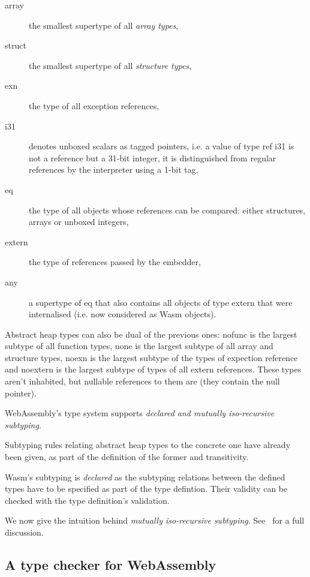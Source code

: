 \documentclass[10pt]{article}
\begin{document}
\begin{description}
\begin{description}
      \item[\textsf{array}] the smallest supertype of all \emph{array types},
      \item[\textsf{struct}] the smallest supertype of all \emph{structure
      types},
      \item[\textsf{exn}] the type of all exception references,
      \item[\textsf{i31}] denotes unboxed scalars as tagged pointers, i.e. a
        value of type \textsf{ref i31} is not a reference but a 31-bit integer,
        it is distinguished from regular references by the interpreter using a
        1-bit tag,
      \item[\textsf{eq}] the type of all objects whose references can be
        compared: either structures, arrays or unboxed integers,
      \item[\textsf{extern}] the type of references passed by the embedder,
      \item[\textsf{any}] a supertype of \textsf{eq} that also contains all
        objects of type \textsf{extern} that were internalised (i.e. now
        considered as Wasm objects).
    \end{description}
    Abstract heap types can also be dual of the previous ones: \textsf{nofunc}
    is the largest subtype of all function types, \textsf{none} is the largest
    subtype of all array and structure types, \textsf{noexn} is the largest
    subtype of the types of expection reference and \textsf{noextern} is the
    largest subtype of types of all extern references. These types aren't
    inhabited, but nullable references to them are (they contain the null
    pointer).

\end{description}

WebAssembly's type system supports \emph{declared and mutually iso-recursive
subtyping}.

Subtyping rules relating abstract heap types to the concrete one have already
been given, as part of the definition of the former and transitivity.

Wasm's subtyping is \emph{declared} as the subtyping relations between the
defined types have to be specified as part of the type defintion. Their validity
can be checked with the type definition's validation.

We now give the intuition behind \emph{mutually iso-recursive subtyping}.
See~\cite{rossberg2023mutually} for a full discussion.
\subsection{A type checker for WebAssembly}
\end{document}
